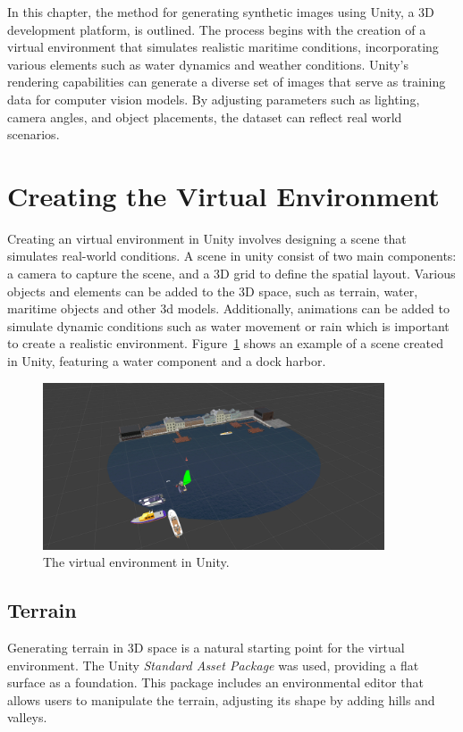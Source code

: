 
In this chapter, the method for generating synthetic images using Unity, a 3D development platform, is outlined. The process begins with the creation of a virtual environment that simulates realistic maritime conditions, incorporating various elements such as water dynamics and weather conditions. Unity's rendering capabilities can generate a diverse set of images that serve as training data for computer vision models. By adjusting parameters such as lighting, camera angles, and object placements, the dataset can reflect real world scenarios. 


\section{Creating the Virtual Environment}
Creating an virtual environment in Unity involves designing a scene that simulates real-world conditions. A scene in unity consist of two main components: a camera to capture the scene, and a 3D grid to define the spatial layout. Various objects and elements can be added to the 3D space, such as terrain, water, maritime objects and other 3d models. Additionally, animations can be added to simulate dynamic conditions such as water movement or rain which is important to create a realistic environment. Figure~\ref{fig:environment} shows an example of a scene created in Unity, featuring a water component and a dock harbor.

\begin{figure}[H]
    \centering
    \includegraphics[width=0.9\textwidth]{Figures/method/environment2.png}
    \caption{The virtual environment in Unity.}
    \label{fig:environment}
    
\end{figure}
 
\subsection{Terrain}
Generating terrain in 3D space is a natural starting point for the virtual environment. The Unity \textit{Standard Asset Package} \cite{unity_standard_assets_installation} was used, providing a flat surface as a foundation. This package includes an environmental editor that allows users to manipulate the terrain, adjusting its shape by adding hills and valleys.

